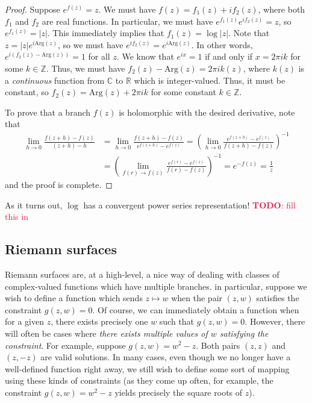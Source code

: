 \documentclass[aps,pra,showpacs,notitlepage,onecolumn,superscriptaddress,nofootinbib]{revtex4-1}
\newcommand{\pop}[1]{\textcolor{crimson}{#1}}
\theoremstyle{definition}
\begin{document}
\begin{proof}
  Suppose $e^{f(z)} = z$. We must have $f(z) = f_1(z) + i f_2(z)$, where both $f_1$ and $f_2$ are real functions. In particular, we must have $e^{f_1(z)} e^{i f_2(z)} = z$, so $e^{f_1(z)} = |z|$.
  This immediately implies that $f_1(z) = \log |z|$. Note that $z = |z| e^{i \text{Arg}(z)}$, so we must have $e^{i f_2(z)} = e^{i \text{Arg}(z)}$. In other words, $e^{i (f_2(z) - \text{Arg}(z))} = 1$
  for all $z$. We know that $e^{i x} = 1$ if and only if $x = 2\pi i k$ for some $k \in \mathbb{Z}$. Thus, we must have $f_2(z) - \text{Arg}(z) = 2\pi i k(z)$, where $k(z)$ is a \emph{continuous}
  function from $\mathbb{C}$ to $\mathbb{R}$ which is integer-valued. Thus, it must be constant, so $f_2(z) = \text{Arg}(z) + 2\pi i k$ for some constant $k \in \mathbb{Z}$.

  To prove that a branch $f(z)$ is holomorphic with the desired derivative, note that
  \begin{align}
    \lim_{h \to 0} \frac{f(z + h) - f(z)}{(z + h) - h} &= \lim_{h \to 0} \frac{f(z + h) - f(z)}{e^{f(z + h)} - e^{f(z)}} = \left( \lim_{h \to 0} \frac{e^{f(z + h)} - e^{f(z)}}{f(z + h) - f(z)} \right)^{-1}
    \\ & = \left( \lim_{f(r) \rightarrow f(z)} \frac{e^{f(r)} - e^{f(z)}}{f(r) - f(z)} \right)^{-1} = e^{-f(z)} = \frac{1}{z}
  \end{align}
  and the proof is complete.
\end{proof}

\noindent As it turns out, $\log$ has a convergent power series representation! \pop{\textbf{TODO}: fill this in}

\subsection{Riemann surfaces}

\noindent Riemann surfaces are, at a high-level, a nice way of dealing with classes of complex-valued functions which have multiple branches.
in particular, suppose we wish to define a function which sends $z \mapsto w$ when the pair $(z, w)$ satisfies the constraint $g(z, w) = 0$. Of course,
we can immediately obtain a function when for a given $z$, there exists precisely one $w$ such that $g(z, w) = 0$. However, there will often be cases
where \emph{there exists multiple values of $w$ satisfying the constraint}. For example, suppose $g(z, w) = w^2 - z$. Both pairs $(z, z)$ and $(z, -z)$
are valid solutions. In many cases, even though we no longer have a well-defined function right away, we still wish to define some sort of mapping
using these kinds of constraints (as they come up often, for example, the constraint $g(z, w) = w^2 - z$ yields precisely the square roots of $z$).
\end{document}
